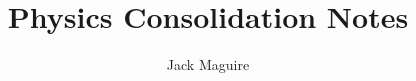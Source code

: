 \documentclass{report}
\title{\huge{Physics Consolidation Notes}}
\author{\huge{Jack Maguire}}
\date{}
\begin{document}
\maketitle

\tableofcontents
\pagebreak






\end{document}

